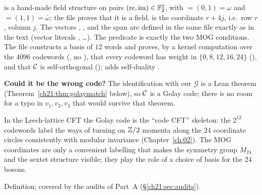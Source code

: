 \begin{dictionary}
 is a hand-made field structure on pairs $(\mathrm{re},\mathrm{im})\in\mathbb{F}_2^2$, with
 $=(0,1)=\omega$ and  $=(1,1)=\bar\omega$; the file proves that it is a field.
 is the coordinate $r+4j$, i.e.\ row $r$, column $j$.  The vectors ,
,  and the span  are defined in the same file exactly as in the text
(vector literals \lean{![1, 0, 0, 1, ᾱ, α]}, \dots).  The predicate is exactly the two MOG conditions.  The file constructs a basis  of $12$
words and proves, by a kernel computation over the $4096$ codewords (, no
), that every codeword has weight in $\{0,8,12,16,24\}$ (),
and that $\mathcal{C}$ is self-orthogonal ();
 adds self-duality .

\textbf{Could it be the wrong code?}  The identification with our $\mathcal G$ is a Lean theorem
(Theorem~\ref{ch21:thm:golaymatch} below), so $\mathcal{C}$ is a Golay code; there is no room for a
typo in $v_1,v_2,v_3$ that would survive that theorem.
\end{dictionary}
\begin{physics}
In the Leech-lattice CFT the Golay code is the ``code CFT'' skeleton: the $2^{12}$ codewords label
the ways of turning on ${\mathbb{Z}}/2$ momenta along the $24$ coordinate circles consistently with modular
invariance (Chapter~\ref{ch:02}).  The MOG coordinates are only a convenient labelling that makes the
symmetry group $M_{24}$ and the sextet structure visible; they play the role of a choice of basis
for the $24$ bosons.
\end{physics}
\begin{status}
Definition; covered by the audits of Part~A (\S\ref{ch21:sec:audits}).
\end{status}

